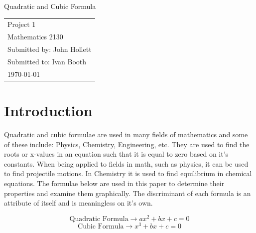 \documentclass[14pt]{extarticle}
\begin{document}
\begin{titlepage}
\vspace*{2in}
\begin{center}
{\LARGE Quadratic and Cubic Formula}
\end{center}

\vspace{2cm}



\vspace{3in}
\begin{flushright}
\begin{tabular}{l}
Project 1 \\
Mathematics 2130\\
Submitted by: John Hollett\\
Submitted to: Ivan Booth\\
\today
\end{tabular}
\end{flushright}


\end{titlepage}


\rfoot{\thepage}




\section{Introduction}
Quadratic and cubic formulae are used in many fields of mathematics and some of these include: Physics, Chemistry, Engineering, etc. They are used to find the roots or x-values in an equation such that it is equal to zero based on it's constants. When being applied to fields in math, such as physics, it can be used to find projectile motions. In Chemistry it is used to find equilibrium in chemical equations. The formulae below are used in this paper to determine their properties and examine them graphically. The discriminant of each formula is an attribute of itself and is meaningless on it's own.


\begin{equation}
	\text{Quadratic Formula} \to ax^2+bx+c=0
	\label{E1}
\end{equation}
\begin{equation}
	\text{Cubic Formula} \to x^3+bx+c=0
	\label{E2}
\end{equation}
\end{document}
